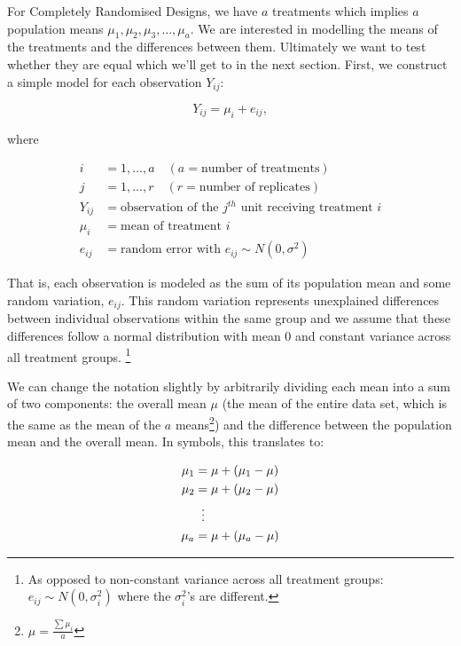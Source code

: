 \documentclass[
  letterpaper,
]{book}
\begin{document}
For Completely Randomised Designs, we have \(a\) treatments which
implies \(a\) population means \(\mu_1, \mu_2, \mu_3, \ldots, \mu_a\).
We are interested in modelling the means of the treatments and the
differences between them. Ultimately we want to test whether they are
equal which we'll get to in the next section. First, we construct a
simple model for each observation \(Y_{ij}\):

\[
Y_{ij} = \mu_{i} + e_{ij},
\]

where

\[
\begin{aligned}
i & = 1, \dots, a \quad (a = \text{number of treatments}) \\
j & = 1, \dots, r \quad (r = \text{number of replicates}) \\
Y_{ij} & = \text{observation of the } j^{th} \text{ unit receiving treatment } i \\
\mu_i & = \text{mean of treatment } i \\
e_{ij} & = \text{random error with } e_{ij} \sim N(0, \sigma^2)
\end{aligned}
\]

That is, each observation is modeled as the sum of its population mean
and some random variation, \(e_{ij}\). This random variation represents
unexplained differences between individual observations within the same
group and we assume that these differences follow a normal distribution
with mean 0 and constant variance across all treatment groups.
\footnote{As opposed to non-constant variance across all treatment
  groups: \(e_{ij} \sim N(0, \sigma^2_{i})\) where the \(\sigma_i^2\)'s
  are different.}

We can change the notation slightly by arbitrarily dividing each mean
into a sum of two components: the overall mean \(\mu\) (the mean of the
entire data set, which is the same as the mean of the \(a\)
means\footnote{\(\mu = \frac{\sum\mu_i}{a}\)}) and the difference
between the population mean and the overall mean. In symbols, this
translates to:

\begin{equation}
\begin{aligned}
\mu_1 &= \mu + (\mu_1 - \mu) \\
\mu_2 &= \mu + (\mu_2 - \mu) \\
&\;\;\vdots \notag \\
\mu_a &= \mu + (\mu_a - \mu)
\end{aligned}
\end{equation}
\end{document}
